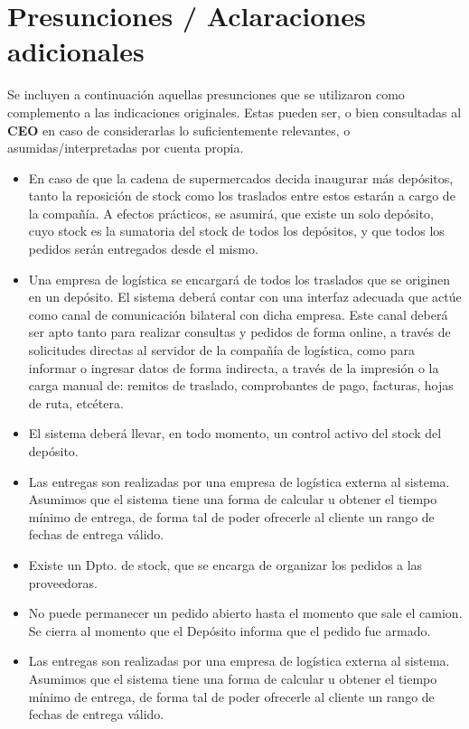 
\section{Presunciones / Aclaraciones adicionales}

Se incluyen a continuación aquellas presunciones que se utilizaron como
complemento a las indicaciones originales. Estas pueden ser, o bien consultadas
al \textbf{CEO} en caso de considerarlas lo suficientemente relevantes, o
asumidas/interpretadas por cuenta propia.

\begin{itemize}

  \item En caso de que la cadena de supermercados decida inaugurar más depósitos, tanto la reposición de stock como los traslados entre estos estarán a cargo de la compañía. A efectos prácticos, se asumirá, que existe un solo depósito, cuyo stock es la sumatoria del stock de todos los depósitos, y que todos los pedidos serán entregados desde el mismo.

  \item Una empresa de logística se encargará de todos los traslados que se originen en un depósito. El sistema deberá contar con una interfaz adecuada que actúe como canal de comunicación bilateral con dicha empresa. Este canal deberá ser apto tanto para realizar consultas y pedidos de forma online, a través de solicitudes directas al servidor de la compañía de logística, como para informar o ingresar datos de forma indirecta, a través de la impresión o la carga manual de: remitos de traslado, comprobantes de pago, facturas, hojas de ruta, etcétera.

  \item El sistema deberá llevar, en todo momento, un control activo del stock del depósito.

  \item Las entregas son realizadas por una empresa de logística externa al sistema. Asumimos que el sistema tiene una forma de calcular u obtener el tiempo mínimo de entrega, de forma tal de poder ofrecerle al cliente un rango de fechas de entrega válido.

  \item Existe un Dpto. de stock, que se encarga de organizar los pedidos a las proveedoras. 

  \item No puede permanecer un pedido abierto hasta el momento que sale el camion. Se cierra al momento que el Depósito informa que el pedido fue armado. 

  \item Las entregas son realizadas por una empresa de logística externa al sistema. Asumimos que el sistema tiene una forma de calcular u obtener el tiempo mínimo de entrega, de forma tal de poder ofrecerle al cliente un rango de fechas de entrega válido.

\end{itemize}
